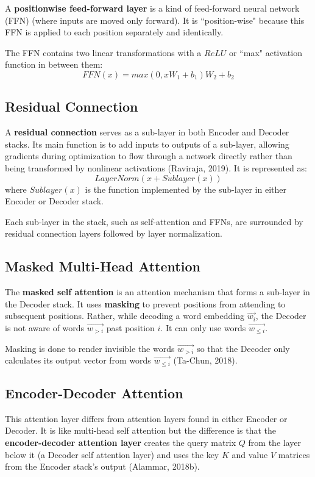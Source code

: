A \textbf{positionwise feed-forward layer} is a kind of feed-forward neural network (FFN) (where inputs are moved only forward). It is ``position-wise" because this FFN is applied to each position separately and identically. 

The FFN contains two linear transformations with a $ReLU$ or ``max" activation function in between them:
$$
FFN(x) = max(0, x W_1 + b_1) W_2 + b_2
$$

\subsection{Residual Connection}

A \textbf{residual connection} serves as a sub-layer in both Encoder and Decoder stacks. Its main function is to add inputs to outputs of a sub-layer, allowing gradients during optimization to flow through a network directly rather than being transformed by nonlinear activations (Raviraja, 2019). It is represented as: 
$$
LayerNorm(x + Sublayer(x))
$$
where $Sublayer(x)$ is the function implemented by the sub-layer in either Encoder or Decoder stack.

Each sub-layer in the stack, such as self-attention and FFNs, are surrounded by residual connection layers followed by layer normalization. 




\subsection{Masked Multi-Head Attention}

The \textbf{masked self attention} is an attention mechanism that forms a sub-layer in the Decoder stack. It uses \textbf{masking} to prevent positions from attending to subsequent positions. Rather, while decoding a word embedding $\overrightarrow{w_i}$, the Decoder is not aware of words  $\overrightarrow{w_{>i}}$ past position $i$. It can only use words $\overrightarrow{w_{\leq i}}$.

Masking is done to render invisible the words $\overrightarrow{w_{>i}}$ so that the Decoder only calculates its output vector from words $\overrightarrow{w_{\leq i}}$ (Ta-Chun, 2018). 

\subsection{Encoder-Decoder Attention}

This attention layer differs from attention layers found in either Encoder or Decoder. It is like multi-head self attention but the difference is that the \textbf{encoder-decoder attention layer} creates the query matrix $Q$ from the layer below it (a Decoder self attention layer) and uses the key $K$ and value $V$ matrices from the Encoder stack's output (Alammar, 2018b). 



